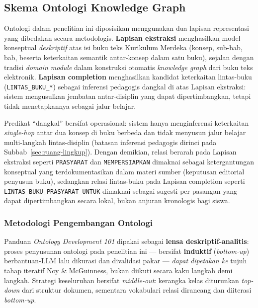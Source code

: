 \documentclass[../../thesis]{subfiles}
\begin{document}
\newcommand{\crossref}[2]{#1}%
%

\subsection{Skema Ontologi Knowledge Graph}
\label{subsec:skema-ontologi}

Ontologi dalam penelitian ini diposisikan menggunakan dua lapisan
representasi yang dibedakan secara metodologis. \textbf{Lapisan
ekstraksi} menghasilkan model konseptual \textit{deskriptif} atas isi
buku teks Kurikulum Merdeka (konsep, sub-bab, bab, beserta
keterkaitan semantik antar-konsep dalam satu buku), sejalan dengan
tradisi \textit{domain module} dalam konstruksi otomatis \textit{knowledge
graph} dari buku teks elektronik. \textbf{Lapisan completion} menghasilkan kandidat
keterkaitan lintas-buku (\texttt{LINTAS\_BUKU\_*}) sebagai inferensi
pedagogis dangkal di atas Lapisan ekstraksi: sistem mengusulkan jembatan
antar-disiplin yang dapat dipertimbangkan, tetapi tidak menetapkannya
sebagai jalur belajar.

Predikat ``dangkal'' bersifat operasional: sistem hanya menginferensi
keterkaitan \textit{single-hop} antar dua konsep di buku berbeda dan
tidak menyusun jalur belajar multi-langkah lintas-disiplin (batasan
inferensi pedagogis dirinci pada \crossref{Subbab~\ref{sec:ruang-lingkup}}{Subbab Ruang Lingkup}).
Dengan demikian, relasi berarah pada Lapisan ekstraksi seperti
\texttt{PRASYARAT} dan \texttt{MEMPERSIAPKAN} dimaknai sebagai
ketergantungan konseptual yang terdokumentasikan dalam materi sumber
(keputusan editorial penyusun buku), sedangkan relasi lintas-buku pada Lapisan
completion seperti \texttt{LINTAS\_BUKU\_PRASYARAT\_UNTUK} dimaknai sebagai
sugesti per-pasangan yang dapat dipertimbangkan secara lokal, bukan anjuran
kronologis bagi siswa.

\subsubsection{Metodologi Pengembangan Ontologi}

Panduan \textit{Ontology Development 101} \parencite{noy_ontology_2001} dipakai
sebagai \textbf{lensa deskriptif-analitis}: proses penyusunan ontologi pada
penelitian ini --- bersifat \textbf{induktif} (\textit{bottom-up})
berbantuan-LLM lalu dikurasi dan divalidasi pakar --- \textit{dapat dipetakan
ke} tujuh tahap iteratif Noy \& McGuinness, bukan diikuti secara kaku langkah
demi langkah. Strategi keseluruhan bersifat \textit{middle-out}: kerangka kelas
diturunkan \textit{top-down} dari struktur dokumen, sementara vokabulari relasi
dirancang dan diiterasi \textit{bottom-up}.
\end{document}
